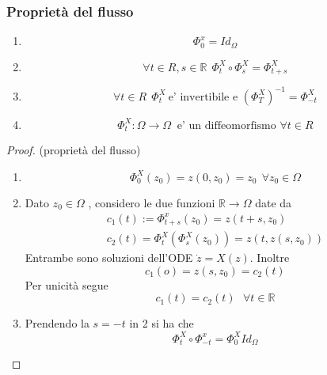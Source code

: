 \documentclass{article}
\theoremstyle{definition}
\newcommand{\R}{\mathbb{R}}
\begin{document}
\subsubsection{Proprietà del flusso }
\begin{enumerate}
	\item $$\Phi_0^x=Id_{\Omega}$$
	\item $$\forall t \in R , s \in \R \ \ \Phi_t^X \circ \Phi_s^X=\Phi_{t+s}^X$$
	\item $$\forall t \in R  \ \ \Phi_t^X \ \text{e' invertibile e }(\Phi_T^X)^{-1}=\Phi_{-t}^X$$
	\item $$\Phi_t^X:  \Omega \rightarrow \Omega \ \text{ e' un diffeomorfismo } \forall t \in R $$
\end{enumerate}
\begin{proof}(proprietà del flusso) \\
	\begin{enumerate}
\item $$\Phi_0^X(z_0)=z(0,z_0)=z_0 \ \ \forall z_0 \in \Omega $$
\item Dato $z_0 \in \Omega $ , considero le due funzioni $\R \rightarrow \Omega$  date da \begin{align*}
	c_1(t):=\Phi_{t+s}^x(z_0)=z(t+s,z_0) \\
	c_2(t)=\Phi_t^X(\Phi_s^X(z_0))=z(t,z(s,z_0))
\end{align*}
Entrambe sono soluzioni  dell'ODE $\dot{z}=X(z)$. Inoltre  $$c_1(o)=z(s,z_0)=c_2(t)$$ Per unicità segue $$c_1(t)=c_2(t) \ \ \ \forall t \in \R $$
\item Prendendo la $s=-t $ in 2 si ha che $$\Phi_t^X \circ \Phi_{-t}^x=\Phi_0^XId_{\Omega}$$
	\end{enumerate}
\end{proof}
\end{document}
